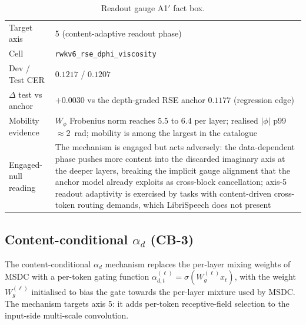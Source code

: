 \begin{table}[h]
\centering
\small
\caption[Readout gauge A1$'$ engaged-null entry]{Readout gauge A1$'$
fact box.}
\label{tab:engaged-null:a1prime}
\setlength{\tabcolsep}{6pt}
\renewcommand{\arraystretch}{1.05}
\begin{tabularx}{\linewidth}{@{}p{3.3cm} X@{}}
\toprule
Target axis & 5 (content-adaptive readout phase) \\
Cell & \texttt{rwkv6\_rse\_dphi\_viscosity} \\
Dev / Test CER & $0.1217$ / $0.1207$ \\
$\Delta$ test vs anchor & $+0.0030$ vs the depth-graded RSE anchor
$0.1177$ (regression edge) \\
Mobility evidence & $W_{\phi}$ Frobenius norm reaches $5.5$ to $6.4$
per layer; realised $|\phi|$ p99 $\approx 2$~rad; mobility is among
the largest in the catalogue \\
Engaged-null reading & The mechanism is engaged but acts adversely:
the data-dependent phase pushes more content into the discarded
imaginary axis at the deeper layers, breaking the implicit gauge
alignment that the anchor model already exploits as
cross-block cancellation; axis-5 readout adaptivity is
exercised by tasks with content-driven cross-token routing
demands, which LibriSpeech does not present \\
\bottomrule
\end{tabularx}
\end{table}

\subsection{Content-conditional $\alpha_{d}$ (CB-3)}\label{app:engaged-null:cb3}

The content-conditional $\alpha_{d}$ mechanism replaces the per-layer
mixing weights of MSDC with a per-token gating function
$\alpha_{d, t}^{(\ell)} = \sigma(W_{g}^{(\ell)} x_{t})$, with the
weight $W_{g}^{(\ell)}$ initialised to bias the gate towards the
per-layer mixture used by MSDC. The mechanism targets axis 5: it
adds per-token receptive-field selection to the input-side
multi-scale convolution.

